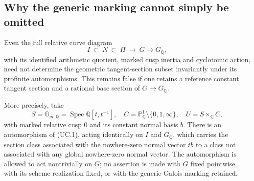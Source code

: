 \subsection{Why the generic marking cannot simply be omitted}
\label{sec:archive-unmarked-curve}

\begin{proposition}
\label{prop:archive-unmarked-curve}
Even the full relative curve diagram
\[
 I\ \subset\ N\ \subset\ \Pi\ \longrightarrow\ G
       \longrightarrow G_{\mathbb Q},                       \tag{UC.1}
\]
with its identified arithmetic quotient, marked cusp inertia and
cyclotomic action, need not determine the geometric tangent-section
subset invariantly under its profinite automorphisms. This remains
false if one retains a reference constant tangent section and a
rational base section of $G\to G_{\mathbb Q}$.

More precisely, take
\[
 S=\mathbb G_{m,\mathbb Q}=\operatorname{Spec}\mathbb Q[t,t^{-1}],
 \quad C=\mathbb P^1_{\mathbb Q}\setminus\{0,1,\infty\},
 \quad U=S\times_{\mathbb Q}C,
\]
with marked relative cusp $0$ and its constant normal basis $b$.
There is an automorphism of (UC.1), acting identically on $I$ and
$G_{\mathbb Q}$, which carries the section class associated with the
nowhere-zero normal vector $t b$ to a class not associated with
any global nowhere-zero normal vector.
The automorphism is allowed to act nontrivially on $G$; no assertion
is made with $G$ fixed pointwise, with its scheme realization fixed,
or with the generic Galois marking retained.
\end{proposition}

